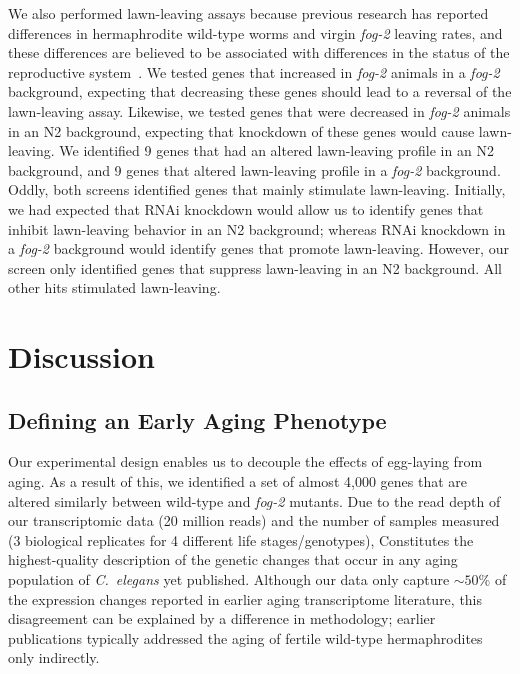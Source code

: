 \documentclass[9pt,twocolumn,twoside]{gsag3jnl}
\newcommand{\cel}{\emph{C.~elegans}}
\newcommand{\fog}{\emph{fog-2}}
\begin{document}
We also performed lawn-leaving assays because previous research has reported differences in hermaphrodite wild-type worms and virgin \fog{} leaving rates, and these differences are believed to be associated with differences in the status of the reproductive system~\citep{Lipton2004}. We tested genes that increased in \fog{} animals in a \fog{} background, expecting that decreasing these genes should lead to a reversal of the lawn-leaving assay. Likewise, we tested genes that were decreased in \fog{} animals in an N2 background, expecting that knockdown of these genes would cause lawn-leaving.
We identified 9 genes that had an altered lawn-leaving profile in an N2 background, and 9 genes that altered lawn-leaving profile in a \fog{} background. Oddly, both screens identified  genes that mainly stimulate lawn-leaving. Initially, we had expected that RNAi knockdown would allow us to identify genes that inhibit lawn-leaving behavior in an N2 background; whereas RNAi knockdown in a \fog{} background would identify genes that promote lawn-leaving. However, our screen only identified genes that suppress lawn-leaving in an N2 background. All other hits stimulated lawn-leaving.



\section*{Discussion}
\label{sec:discussion}

\subsection*{Defining an Early Aging Phenotype}
\label{sub:Defining an Early Aging Phenotype}

Our experimental design enables us to decouple the effects of egg-laying from aging. As a result of this, we identified a set of almost 4,000 genes that are altered similarly between wild-type and \fog{} mutants. Due to the read depth of our transcriptomic data (20 million reads) and the number of samples measured (3 biological replicates for 4 different life stages/genotypes), Constitutes the highest-quality description of the genetic changes that occur in any aging population of \cel{} yet published.
Although our data only capture $\sim50\%$ of the expression changes reported in earlier aging transcriptome literature, this disagreement can be explained by a difference in methodology; earlier publications typically addressed the aging of fertile wild-type hermaphrodites only indirectly.
\end{document}
